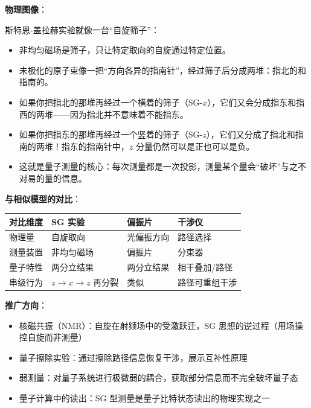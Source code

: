 \begin{insightbox}[物理图像与模型关联]
\textbf{物理图像}：

斯特恩-盖拉赫实验就像一台``自旋筛子''：
\begin{itemize}[nosep]
    \item 非均匀磁场是筛子，只让特定取向的自旋通过特定位置。
    \item 未极化的原子束像一把``方向各异的指南针''，经过筛子后分成两堆：指北的和指南的。
    \item 如果你把指北的那堆再经过一个横着的筛子（SG-$x$），它们又会分成指东和指西的两堆——因为指北并不意味着不能指东。
    \item 如果你把指东的那堆再经过一个竖着的筛子（SG-$z$），它们又分成了指北和指南的两堆！指东的指南针中，$z$ 分量仍然可以是正也可以是负。
    \item 这就是量子测量的核心：每次测量都是一次投影，测量某个量会``破坏''与之不对易的量的信息。
\end{itemize}

\textbf{与相似模型的对比}：
\begin{center}
\begin{tabular}{llll}
\toprule
\textbf{对比维度} & \textbf{SG 实验} & \textbf{偏振片} & \textbf{干涉仪} \\
\midrule
物理量 & 自旋取向 & 光偏振方向 & 路径选择 \\
测量装置 & 非均匀磁场 & 偏振片 & 分束器 \\
量子特性 & 两分立结果 & 两分立结果 & 相干叠加/路径 \\
串级行为 & $z\to x\to z$ 再分裂 & 类似 & 路径可重组干涉 \\
\bottomrule
\end{tabular}
\end{center}

\textbf{推广方向}：
\begin{itemize}[nosep]
    \item 核磁共振（NMR）：自旋在射频场中的受激跃迁，SG 思想的逆过程（用场操控自旋而非测量）
    \item 量子擦除实验：通过擦除路径信息恢复干涉，展示互补性原理
    \item 弱测量：对量子系统进行极微弱的耦合，获取部分信息而不完全破坏量子态
    \item 量子计算中的读出：SG 型测量是量子比特状态读出的物理实现之一
\end{itemize}
\end{insightbox}

